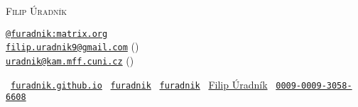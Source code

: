 \newenvironment{work}[4] {{\textbf{#1}, \textsc{#2} \hfill \gray\small\itshape #4,\hspace{3pt} #3}\break\small}{}
\newcommand\worksplit{\vspace{1.5em}}

\newcommand\skill[2]{ \textbf{#1.} {\small\itshape #2}}
\newcommand\skillsplit{\vspace{1.5em}}
\newcommand\schoolsplit{\vspace{1.5em}}

\newcommand\schooltitle[4]{{\textbf{#1}\hfill \gray\small\itshape #2,\hspace{3pt} #4\break}\textsc{#3}}
\newenvironment{school}[4]
{\schooltitle{#1}{#2}{#3}{#4}\hfill\break\small}{}

\newenvironment{intro}{\vspace{.3em}\begin{quote}}{\end{quote}\vspace{.3em}}




\begin{multicols}{2}
	{\fontsize{36}{36}\selectfont\scshape{Filip Úradník}} %

	\columnbreak
	\hfill
	\begin{minipage}{.330\textwidth}
	\small
	\hspace{.4em}\hfill\break
	\texttt{\href{https://matrix.to/\#/@furadnik:matrix.org}{@furadnik:matrix.org}} \\
	\texttt{\href{mailto:filip.uradnik9@gmail.com}{filip.uradnik9@gmail.com}}\; () \\
	\texttt{\href{mailto:uradnik@kam.mff.cuni.cz}{uradnik@kam.mff.cuni.cz}} \; ()
	\end{minipage}
\end{multicols}

\vspace{.2em}

\begin{center}
	\small
	\hspace{.5in}
	\faGlobe\ \texttt{\href{https://furadnik.github.io}{furadnik.github.io}}
	\hfill
	\faGithub\ \texttt{\href{https://github.com/furadnik}{furadnik}}                                                                      
	\hfill
	\faLinkedin\ \texttt{\href{https://www.linkedin.com/in/furadnik/}{furadnik}}
	\hfill
	\aiGoogleScholarSquare\ \href{https://scholar.google.com/citations?user=7AvTiqgAAAAJ}{Filip Úradník}
	\hfill
	\aiOrcid\ \texttt{\href{https://orcid.org/0009-0009-3058-6608}{0009-0009-3058-6608}}
	\hspace{.5in}

\end{center}

